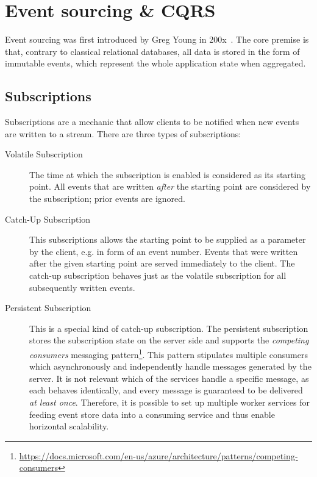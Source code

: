 \section{Event sourcing \& CQRS}
\label{sec:fundamentals:event}

Event sourcing was first introduced by Greg Young in 200x~\cite{source/link}.
The core premise is that, contrary to classical relational databases, all data is stored in the form of immutable events, which represent the whole application state when aggregated.


\cite{WEB:Fowler:2005}

\cite{WEB:Fowler:2011}

\subsection{Subscriptions}

Subscriptions are a mechanic that allow clients to be notified when new events are written to a stream.
There are three types of subscriptions:

\begin{description}
\item[Volatile Subscription]
The time at which the subscription is enabled is considered as its starting point.
All events that are written \emph{after} the starting point are considered by the subscription; prior events are ignored.
\item[Catch-Up Subscription]
This subscriptions allows the starting point to be supplied as a parameter by the client, e.g. in form of an event number.
Events that were written after the given starting point are served immediately to the client.
The catch-up subscription behaves just as the volatile subscription for all subsequently written events.
\item[Persistent Subscription] 
This is a special kind of catch-up subscription.
The persistent subscription stores the subscription state on the server side and supports the \emph{competing consumers} messaging pattern\footnote{\url{https://docs.microsoft.com/en-us/azure/architecture/patterns/competing-consumers}}.
This pattern stipulates multiple consumers which asynchronously and independently handle messages generated by the server.
It is not relevant which of the services handle a specific message, as each behaves identically, and every message is guaranteed to be delivered \emph{at least once}.
Therefore, it is possible to set up multiple worker services for feeding event store data into a consuming service and thus enable horizontal scalability.
\end{description}


